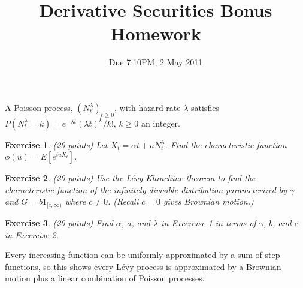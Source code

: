 \documentclass[11pt,fleqn]{amsproc}
\newtheorem{xca}{Exercise}
\begin{document}
\title{Derivative Securities Bonus Homework}
\author{Due 7:10PM, 2 May 2011}

\maketitle

A Poisson process, $(N_t^\lambda)_{t\ge0}$, with hazard rate $\lambda$
satisfies $P(N_t^\lambda = k) = e^{-\lambda t}(\lambda t)^k/k!$, $k\ge0$
an integer.

\begin{xca}{(20 points)}
Let $X_t = \alpha t + aN_t^\lambda$. Find the {\em characteristic
function} $\phi(u) = E[e^{iuX_t}]$.

\end{xca}

\begin{xca}{(20 points)}
Use the L\'evy-Khinchine theorem to find the characteristic function
of the infinitely divisible distribution parameterized by $\gamma$
and $G = b1_{[c,\infty)}$ where $c\not=0$. (Recall $c = 0$ gives
Brownian motion.)

\end{xca}

\begin{xca}{(20 points)}
Find $\alpha$, $a$, and $\lambda$ in Excercise 1 in terms of
$\gamma$, $b$, and $c$ in Excercise 2.

\end{xca}

Every increasing function can be uniformly approximated by a sum of
step functions, so this shows every L\'evy process is approximated by
a Brownian motion plus a linear combination of Poisson processes.
\end{document}

